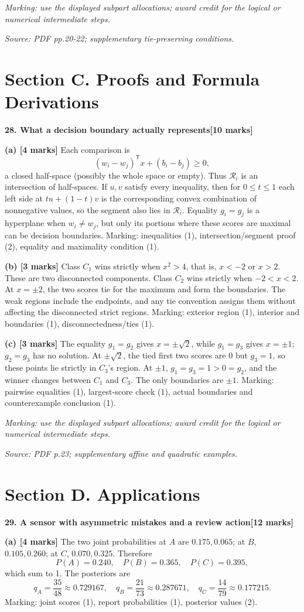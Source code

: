 \documentclass[11pt,a4paper]{article}
\begin{document}
\textit{Marking: use the displayed subpart allocations; award credit for the logical or numerical intermediate steps.}\par
{\footnotesize\textit{Source: PDF pp.20-22; supplementary tie-preserving conditions.}}
\newpage\section*{Section C. Proofs and Formula Derivations}
\textbf{28. What a decision boundary actually represents}\hfill\textbf{[10 marks]}\par\medskip
\textbf{(a) [4 marks]} Each comparison is
\[
(w_i-w_j)^\mathsf Tx+(b_i-b_j)\ge0,
\]
a closed half-space (possibly the whole space or empty). Thus \(\mathcal R_i\) is an intersection of half-spaces. If \(u,v\) satisfy every inequality, then for \(0\le t\le1\) each left side at \(tu+(1-t)v\) is the corresponding convex combination of nonnegative values, so the segment also lies in \(\mathcal R_i\). Equality \(g_i=g_j\) is a hyperplane when \(w_i\ne w_j\), but only its portions where these scores are maximal can be decision boundaries. Marking: inequalities (1), intersection/segment proof (2), equality and maximality condition (1).

\textbf{(b) [3 marks]} Class \(C_1\) wins strictly when \(x^2>4\), that is, \(x<-2\) or \(x>2\). These are two disconnected components. Class \(C_2\) wins strictly when \(-2<x<2\). At \(x=\pm2\), the two scores tie for the maximum and form the boundaries. The weak regions include the endpoints, and any tie convention assigns them without affecting the disconnected strict regions. Marking: exterior region (1), interior and boundaries (1), disconnectedness/ties (1).

\textbf{(c) [3 marks]} The equality \(g_1=g_2\) gives \(x=\pm\sqrt2\), while \(g_1=g_3\) gives \(x=\pm1\); \(g_2=g_3\) has no solution. At \(\pm\sqrt2\), the tied first two scores are 0 but \(g_3=1\), so these points lie strictly in \(C_3\)'s region. At \(\pm1\), \(g_1=g_3=1>0=g_2\), and the winner changes between \(C_1\) and \(C_3\). The only boundaries are \(\pm1\). Marking: pairwise equalities (1), largest-score check (1), actual boundaries and counterexample conclusion (1).

\textit{Marking: use the displayed subpart allocations; award credit for the logical or numerical intermediate steps.}\par
{\footnotesize\textit{Source: PDF p.23; supplementary affine and quadratic examples.}}
\newpage\section*{Section D. Applications}
\textbf{29. A sensor with asymmetric mistakes and a review action}\hfill\textbf{[12 marks]}\par\medskip
\textbf{(a) [4 marks]} The two joint probabilities at \(A\) are \(0.175,0.065\); at \(B\), \(0.105,0.260\); at \(C\), \(0.070,0.325\). Therefore
\[
P(A)=0.240,\quad P(B)=0.365,\quad P(C)=0.395,
\]
which sum to 1. The posteriors are
\[
q_A=\frac{35}{48}\approx0.729167,\quad
q_B=\frac{21}{73}\approx0.287671,\quad
q_C=\frac{14}{79}\approx0.177215.
\]
Marking: joint scores (1), report probabilities (1), posterior values (2).
\end{document}
